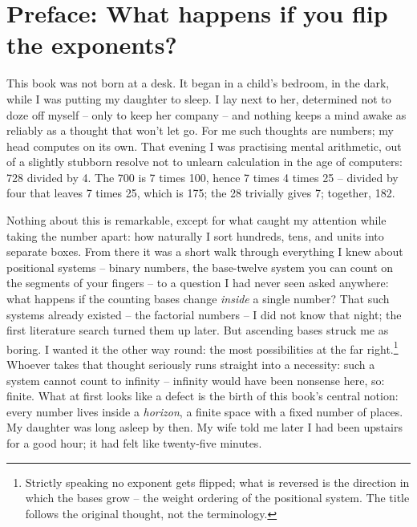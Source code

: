 \chapter*{Preface: What happens if you flip the exponents?}

This book was not born at a desk. It began in a child's bedroom, in
the dark, while I was putting my daughter to sleep. I lay
next to her, determined not to doze off myself -- only to keep her
company -- and nothing keeps a mind awake as reliably as a thought
that won't let go. For me such thoughts are numbers; my head
computes on its own. That evening I was practising mental
arithmetic, out of a slightly stubborn resolve not to unlearn
calculation in the age of computers: 728 divided by 4. The 700 is 7
times 100, hence 7 times 4 times 25 -- divided by four that leaves
7 times 25, which is 175; the 28 trivially gives 7; together, 182.

Nothing about this is remarkable, except for what caught my
attention while taking the number apart: how naturally I sort
hundreds, tens, and units into separate boxes. From there it was a
short walk through everything I knew about positional systems --
binary numbers, the base-twelve system you can count on the
segments of your fingers -- to a question I had never seen asked
anywhere: what happens if the counting bases change \emph{inside} a
single number? That such systems already existed -- the factorial
numbers -- I did not know that night; the first literature search
turned them up later. But ascending bases struck me as boring. I
wanted it the other way round: the most possibilities at the far
right.\footnote{Strictly speaking no exponent gets flipped; what is
reversed is the direction in which the bases grow -- the weight
ordering of the positional system. The title follows the original
thought, not the terminology.} Whoever takes that thought seriously
runs straight into a necessity: such a system cannot count to
infinity -- infinity would have been nonsense here, so: finite.
What at first looks like a defect is the birth of this book's
central notion: every number lives inside a \emph{horizon}, a
finite space with a fixed number of places. My daughter was long
asleep by then. My wife told me later I had been upstairs for a
good hour;
it had felt like twenty-five minutes.

